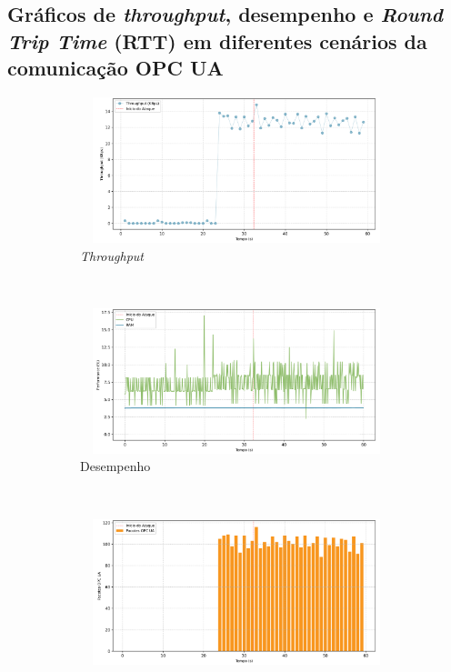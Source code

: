 \begin{apendicesenv}
\chapter{Gráficos de \textit{throughput}, desempenho e \textit{Round Trip Time} (RTT) em diferentes cenários da comunicação OPC UA}\label{ap:graficos}

\begin{figure}[htbp!]
    \centering
    \begin{subfigure}[t]{0.5\textwidth}
        \centering
        \includegraphics[width=1\textwidth, height=120pt]{USPSC-img/output/cropped/0-dos_certificate_inf_chain_loop-tput.png}
        \caption{\textit{Throughput}}
    \end{subfigure}%
    ~ 
    \begin{subfigure}[t]{0.5\textwidth}
        \centering
        \includegraphics[width=1\textwidth, height=120pt]{USPSC-img/output/cropped/0-dos_certificate_inf_chain_loop-perf.png}
        \caption{Desempenho}
    \end{subfigure}%
    \\
    \begin{subfigure}[t]{0.5\textwidth}
        \centering
        \includegraphics[width=1\textwidth, height=120pt]{USPSC-img/output/cropped/0-dos_certificate_inf_chain_loop-pack.png}

\end{subfigure}
\end{figure}
\end{apendicesenv}
